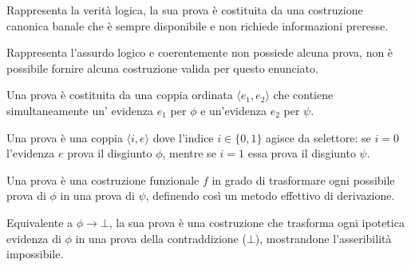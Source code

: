 \begin{description}[leftmargin=1.5em, style=nextline, font=\bfseries]
    \item[$\top$] 
        Rappresenta la verità logica, la sua prova è costituita da una costruzione canonica banale che è sempre disponibile 
        e non richiede informazioni preresse.
    \item[$\bot$] 
        Rappresenta l'assurdo logico e coerentemente non possiede alcuna prova, non è possibile fornire alcuna 
        costruzione valida per questo enunciato.
    \item[$\phi \land \psi$] 
        Una prova è costituita da una coppia ordinata $\langle e_1, e_2 \rangle$ che contiene simultaneamente un'
        evidenza $e_1$ per $\phi$ e un'evidenza $e_2$ per $\psi$.
    \item[$\phi \lor \psi$] 
        Una prova è una coppia $\langle i, e \rangle$ dove l'indice $i \in \{0, 1\}$ agisce da selettore: se $i=0$ 
        l'evidenza $e$ prova il disgiunto $\phi$, mentre se $i=1$ essa prova il disgiunto $\psi$.
    \item[$\phi \to \psi$] 
        Una prova è una costruzione funzionale $f$ in grado di trasformare ogni possibile prova di $\phi$ in una prova 
        di $\psi$, definendo così un metodo effettivo di derivazione.
    \item[$\neg \phi$] 
        Equivalente a $\phi \to \bot$, la sua prova è una costruzione che trasforma ogni ipotetica evidenza di 
        $\phi$ in una prova della contraddizione ($\bot$), mostrandone l'asseribilità impossibile.
\end{description}